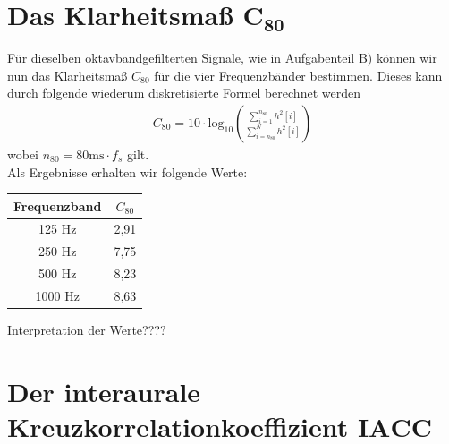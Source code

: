 \section{Das Klarheitsmaß $\mathbf{C_{80}}$}
\label{sec:c80}
Für dieselben oktavbandgefilterten Signale, wie in Aufgabenteil B) können wir nun das Klarheitsmaß $C_{80}$ für die vier Frequenzbänder bestimmen.
Dieses kann durch folgende wiederum diskretisierte Formel berechnet werden
\begin{align*}
C_{80} = 10\cdot \mathrm{log}_{10}\left(\frac{ \sum_{i=1}^{n_{80}} h^2[i]}{\sum_{i=n_{80}}^N h^2[i]}\right)
\end{align*}
wobei $n_{80} = 80 \mathrm{ms} \cdot f_s$ gilt. \\
Als Ergebnisse erhalten wir folgende Werte:
\begin{table}[H]
\centering
\begin{tabular}{ c | c }
  Frequenzband & $C_{80}$ \\
  \hline
  125 Hz & 2,91 \\
  250 Hz & 7,75 \\
  500 Hz & 8,23 \\
  1000 Hz & 8,63  \\
  \end{tabular}
\end{table}

Interpretation der Werte????

\section{Der interaurale Kreuzkorrelationkoeffizient $\mathbf{IACC}$}
\label{sec:iacc}

